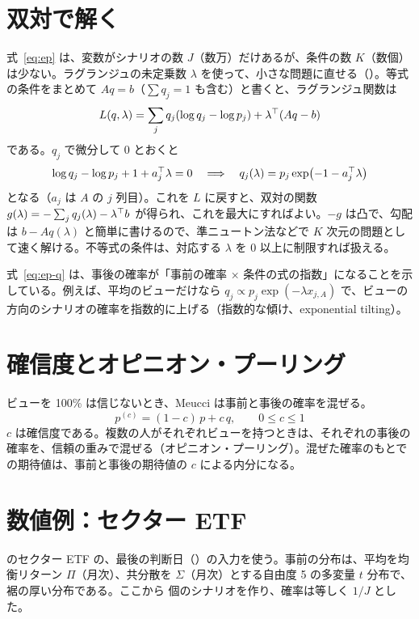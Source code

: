 \section{双対で解く}

式~\eqref{eq:ep} は、変数がシナリオの数 $J$（数万）だけあるが、条件の数 $K$（数個）は少ない。ラグランジュの未定乗数 $\lambda$ を使って、小さな問題に直せる（）。等式の条件をまとめて $Aq=b$（$\sum q_j=1$ も含む）と書くと、ラグランジュ関数は
\begin{equation}
L(q,\lambda)=\sum_j q_j(\log q_j-\log p_j)+\lambda^{\top}(Aq-b)
\end{equation}
である。$q_j$ で微分して 0 とおくと
\begin{equation}
\log q_j-\log p_j+1+a_j^{\top}\lambda=0\quad\Longrightarrow\quad q_j(\lambda)=p_j\exp\bigl(-1-a_j^{\top}\lambda\bigr)
\label{eq:ep-q}
\end{equation}
となる（$a_j$ は $A$ の $j$ 列目）。これを $L$ に戻すと、双対の関数 $g(\lambda)=-\sum_j q_j(\lambda)-\lambda^{\top} b$ が得られ、これを最大にすればよい。$-g$ は凸で、勾配は $b-Aq(\lambda)$ と簡単に書けるので、準ニュートン法などで $K$ 次元の問題として速く解ける。不等式の条件は、対応する $\lambda$ を 0 以上に制限すれば扱える。

式~\eqref{eq:ep-q} は、事後の確率が「事前の確率 × 条件の式の指数」になることを示している。例えば、平均のビューだけなら $q_j\propto p_j\exp(-\lambda x_{j,A})$ で、ビューの方向のシナリオの確率を指数的に上げる（指数的な傾け、exponential tilting）。

\section{確信度とオピニオン・プーリング}

ビューを 100\% は信じないとき、Meucci は事前と事後の確率を混ぜる。
\begin{equation}
p^{(c)}=(1-c)\,p+c\,q,\qquad 0\le c\le1
\label{eq:ep-pool}
\end{equation}
$c$ は確信度である。複数の人がそれぞれビューを持つときは、それぞれの事後の確率を、信頼の重みで混ぜる（オピニオン・プーリング）。混ぜた確率のもとでの期待値は、事前と事後の期待値の $c$ による内分になる。

\section{数値例：セクター ETF}

 のセクター ETF の、最後の判断日（）の入力を使う。事前の分布は、平均を均衡リターン $\Pi$（月次）、共分散を $\Sigma$（月次）とする自由度 5 の多変量 $t$ 分布で、裾の厚い分布である。ここから  個のシナリオを作り、確率は等しく $1/J$ とした。

